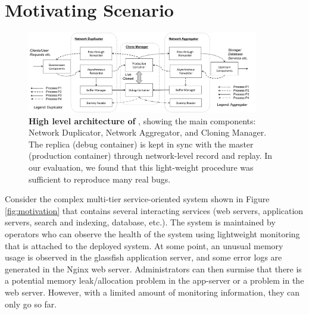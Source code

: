 
\section{Motivating Scenario}
\label{sec:motivation}


\begin{figure}[t]
	\begin{centering}
		\includegraphics[width=0.9\textwidth]{parikshan/figs/arch_full.pdf}
		\caption{\textbf{High level architecture of \parikshan}, showing the main components: Network Duplicator, Network Aggregator, and Cloning Manager. The replica (debug container) is kept in sync with the master (production container) through network-level record and replay. In our evaluation, we found that this light-weight procedure was sufficient to reproduce many real bugs.}
		\label{fig:network_arch}
	\end{centering}
\end{figure}

Consider the complex multi-tier service-oriented system shown in Figure \ref{fig:motivation} that contains several interacting services (web servers, application servers, search and indexing, database, etc.). 
The system is maintained by operators who can observe the health of the system using lightweight monitoring that is attached to the deployed system.
At some point, an unusual memory usage is observed in the glassfish application server, and some error logs are generated in the Nginx web server. 
Administrators can then surmise that there is a potential memory leak/allocation problem in the app-server or a problem in the web server.
However, with a limited amount of monitoring information, they can only go so far.


